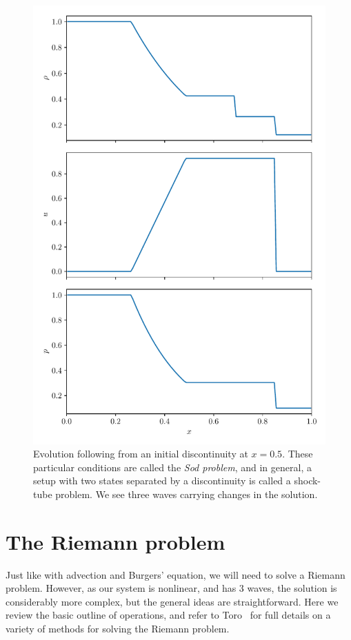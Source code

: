 \begin{figure}
\centering
\includegraphics[width=0.8\linewidth]{riemann-sod}
\caption[The Sod problem]{\label{fig:sod} Evolution following from an initial
  discontinuity at $x = 0.5$.  These particular conditions are called
  the {\em Sod problem}, and in general, a setup with two states
  separated by a discontinuity is called a shock-tube problem.  We see three
  waves carrying changes in the solution. \\
  }
\end{figure}






\section{The Riemann problem}

Just like with advection and Burgers' equation, we will need to solve
a Riemann problem.  However, as our system is nonlinear, and has 3
waves, the solution is considerably more complex, but the general
ideas are straightforward.  Here we review the basic outline of
operations, and refer to Toro~\cite{toro:1997} for full details on a
variety of methods for solving the Riemann problem.

